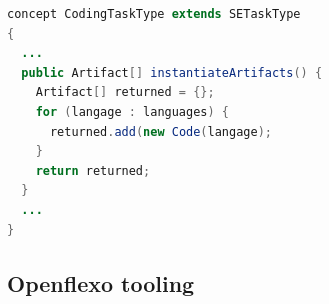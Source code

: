 \begin{lstlisting}[breaklines=true, language=java, basicstyle=\ttfamily\scriptsize, mathescape=true]
concept CodingTaskType extends SETaskType 
{
  ...
  public Artifact[] instantiateArtifacts() {
    Artifact[] returned = {}; 
    for (langage : languages) {
      returned.add(new Code(langage); 
    }
    return returned;
  }
  ...
}    
\end{lstlisting}


\subsection{Openflexo tooling}



